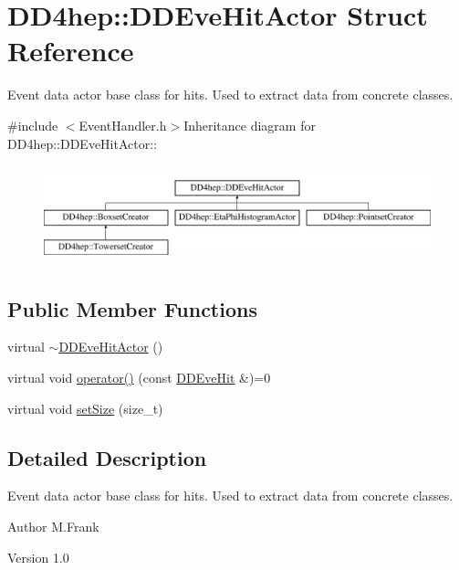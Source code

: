 \hypertarget{struct_d_d4hep_1_1_d_d_eve_hit_actor}{
\section{DD4hep::DDEveHitActor Struct Reference}
\label{struct_d_d4hep_1_1_d_d_eve_hit_actor}
}


Event data actor base class for hits. Used to extract data from concrete classes.  


{\ttfamily \#include $<$EventHandler.h$>$}Inheritance diagram for DD4hep::DDEveHitActor::\begin{figure}[H]
\begin{center}
\leavevmode
\includegraphics[height=2.87179cm]{struct_d_d4hep_1_1_d_d_eve_hit_actor}
\end{center}
\end{figure}
\subsection*{Public Member Functions}
\begin{DoxyCompactItemize}
\item 
virtual \hyperlink{struct_d_d4hep_1_1_d_d_eve_hit_actor_a9706da47b8da6351434ea0f9d41d19d4}{$\sim$DDEveHitActor} ()
\item 
virtual void \hyperlink{struct_d_d4hep_1_1_d_d_eve_hit_actor_a612a0a84bfe41620203555b044019788}{operator()} (const \hyperlink{class_d_d4hep_1_1_d_d_eve_hit}{DDEveHit} \&)=0
\item 
virtual void \hyperlink{struct_d_d4hep_1_1_d_d_eve_hit_actor_afb0005607761c55de470605dd4cc2acd}{setSize} (size\_\-t)
\end{DoxyCompactItemize}


\subsection{Detailed Description}
Event data actor base class for hits. Used to extract data from concrete classes. \begin{DoxyAuthor}{Author}
M.Frank 
\end{DoxyAuthor}
\begin{DoxyVersion}{Version}
1.0 
\end{DoxyVersion}


